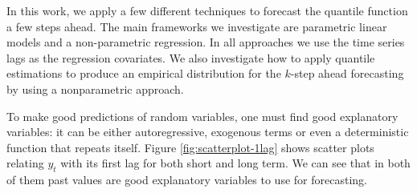 In this work, we apply a few different techniques to forecast the quantile function a few steps ahead. The main frameworks we investigate are parametric linear models and a non-parametric regression. In all approaches we use the time series lags as the regression covariates. We also investigate how to apply quantile estimations to produce an empirical distribution for the $k$-step ahead forecasting by using a nonparametric approach.


To make good predictions of random variables, one must find good explanatory variables: it can be either autoregressive, exogenous terms or even a deterministic function that repeats itself. 
Figure \ref{fig:scatterplot-1lag} shows scatter plots relating $y_t$ with its first lag for both short and long term. We can see that in both of them past values are good explanatory variables to use for forecasting.

